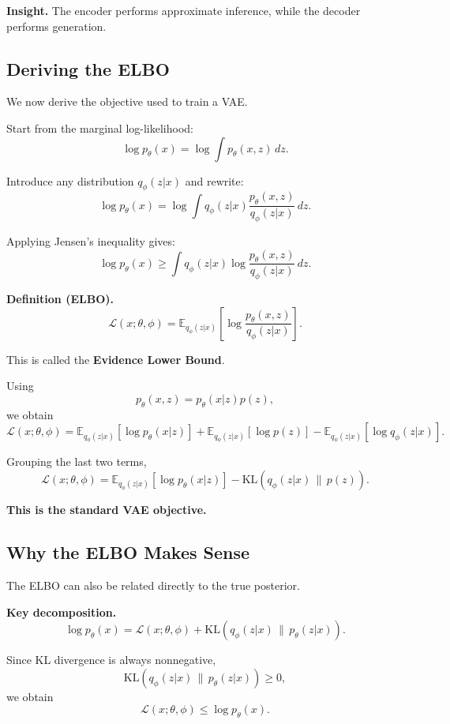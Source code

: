 \noindent
\textbf{Insight.}  
The encoder performs approximate inference, while the decoder performs generation.

\subsection{Deriving the ELBO}

We now derive the objective used to train a VAE.

\medskip

\noindent
Start from the marginal log-likelihood:
\[
\log p_\theta(x)=\log \int p_\theta(x,z)\,dz.
\]

Introduce any distribution $q_\phi(z|x)$ and rewrite:
\[
\log p_\theta(x)
=
\log \int q_\phi(z|x)\frac{p_\theta(x,z)}{q_\phi(z|x)}\,dz.
\]

Applying Jensen's inequality gives:
\[
\log p_\theta(x)
\ge
\int q_\phi(z|x)\log \frac{p_\theta(x,z)}{q_\phi(z|x)}\,dz.
\]

\medskip

\noindent
\textbf{Definition (ELBO).}
\[
\mathcal{L}(x;\theta,\phi)
=
\mathbb{E}_{q_\phi(z|x)}
\left[
\log \frac{p_\theta(x,z)}{q_\phi(z|x)}
\right].
\]

This is called the \textbf{Evidence Lower Bound}.

\medskip

\noindent
Using
\[
p_\theta(x,z)=p_\theta(x|z)p(z),
\]
we obtain
\[
\mathcal{L}(x;\theta,\phi)
=
\mathbb{E}_{q_\phi(z|x)}[\log p_\theta(x|z)]
+
\mathbb{E}_{q_\phi(z|x)}[\log p(z)]
-
\mathbb{E}_{q_\phi(z|x)}[\log q_\phi(z|x)].
\]

Grouping the last two terms,
\[
\mathcal{L}(x;\theta,\phi)
=
\mathbb{E}_{q_\phi(z|x)}[\log p_\theta(x|z)]
-
\mathrm{KL}\!\left(q_\phi(z|x)\,\|\,p(z)\right).
\]

\medskip

\noindent
\textbf{This is the standard VAE objective.}

\subsection{Why the ELBO Makes Sense}

The ELBO can also be related directly to the true posterior.

\medskip

\noindent
\textbf{Key decomposition.}
\[
\log p_\theta(x)
=
\mathcal{L}(x;\theta,\phi)
+
\mathrm{KL}\!\left(q_\phi(z|x)\,\|\,p_\theta(z|x)\right).
\]

Since KL divergence is always nonnegative,
\[
\mathrm{KL}\!\left(q_\phi(z|x)\,\|\,p_\theta(z|x)\right)\ge 0,
\]
we obtain
\[
\mathcal{L}(x;\theta,\phi)\le \log p_\theta(x).
\]

